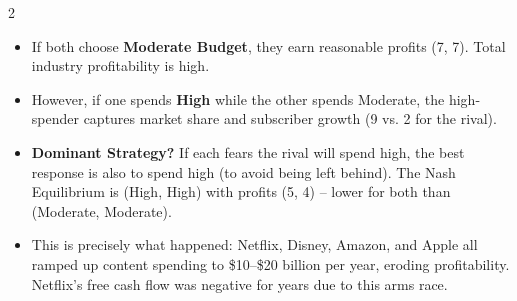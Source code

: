 \documentclass[10pt,a4paper]{article}
\begin{document}
\begin{multicols}{2}
\begin{itemize}[leftmargin=*,nosep]
    \item If both choose \textbf{Moderate Budget}, they earn reasonable profits (7, 7). Total industry profitability is high.
    \item However, if one spends \textbf{High} while the other spends Moderate, the high-spender captures market share and subscriber growth (9 vs. 2 for the rival).
    \item \textbf{Dominant Strategy?} If each fears the rival will spend high, the best response is also to spend high (to avoid being left behind). The Nash Equilibrium is (High, High) with profits (5, 4) -- lower for both than (Moderate, Moderate).
    \item This is precisely what happened: Netflix, Disney, Amazon, and Apple all ramped up content spending to \$10--\$20 billion per year, eroding profitability. Netflix's free cash flow was negative for years due to this arms race.
\end{itemize}


\end{multicols}
\end{document}
